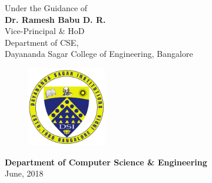 \begin{titlingpage}
Under the Guidance of\\
\Large{\textbf{Dr. Ramesh Babu D. R.}}\\
\large{Vice-Principal \& HoD}\\
Department of CSE,\\
Dayananda Sagar College of Engineering, Bangalore\\

\vspace{0.4cm}

\vfill

\begin{figure}[h]
    \centering
    \includegraphics[height=3.5cm]{images/dsi.png}
\end{figure}

\vfill

\textbf{Department of Computer Science \& Engineering}\\
June, 2018

\end{titlingpage}
